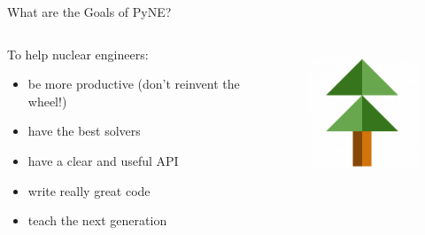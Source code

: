 \documentclass[xcolor=x11names,compress]{beamer}
\renewcommand{\(}{\begin{columns}}
\renewcommand{\)}{\end{columns}}
\newcommand{\<}[1]{\begin{column}{#1}}
\renewcommand{\>}{\end{column}}
\begin{document}
\begin{frame}{What are the Goals of PyNE?}

    \begin{columns}
    \begin{column}{0.45\textwidth}
        To help nuclear engineers:
        \begin{itemize}
        \item be more \alert{productive} (don't reinvent the wheel!)
        \item have the \alert{best solvers}
        \item have a \alert{clear and useful API}
        \item write really \alert{great code}
        \item \alert{teach} the next generation
        \end{itemize}
  	\end{column}
 	\begin{column}{0.45\textwidth}
 	   \begin{center}
 	   \begin{figure}
       \includegraphics[height=4cm]{../figs/pyne-icon-big}
	   \end{figure}
 	   \end{center}
  	\end{column}
	\end{columns}

\end{frame}

\end{document}

